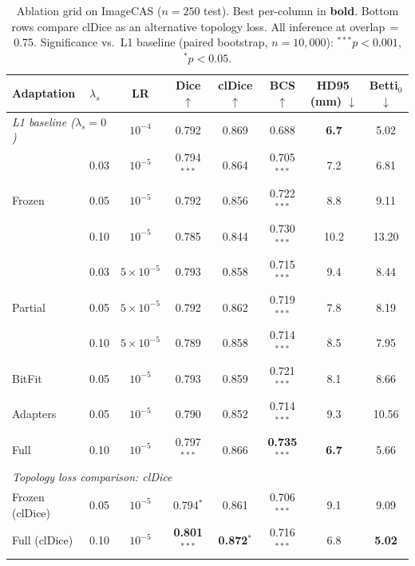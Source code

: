 \documentclass[runningheads]{llncs}
\begin{document}
\begin{table}[t]
\caption{Ablation grid on ImageCAS ($n{=}250$ test). Best per-column in \textbf{bold}. Bottom rows compare clDice as an alternative topology loss. All inference at overlap$\,{=}\,$0.75. Significance vs.\ L1 baseline (paired bootstrap, $n{=}10{,}000$): $^{***}p{<}0.001$, $^{*}p{<}0.05$.}
\label{tab:ablation}
\centering
\small
\begin{tabular}{llcccccc}
\toprule
Adaptation & $\lambda_s$ & LR & Dice $\uparrow$ & clDice $\uparrow$ & BCS $\uparrow$ & HD95\,(mm) $\downarrow$ & Betti$_0$ $\downarrow$ \\
\midrule
\multicolumn{2}{l}{\textit{L1 baseline ($\lambda_s{=}0$)}} & $10^{-4}$ & 0.792 & 0.869 & 0.688 & \textbf{6.7} & 5.02 \\
\midrule
\multirow{3}{*}{Frozen}
 & 0.03 & $10^{-5}$ & 0.794$^{***}$ & 0.864 & 0.705$^{***}$ & 7.2 & 6.81 \\
 & 0.05 & $10^{-5}$ & 0.792 & 0.856 & 0.722$^{***}$ & 8.8 & 9.11 \\
 & 0.10 & $10^{-5}$ & 0.785 & 0.844 & 0.730$^{***}$ & 10.2 & 13.20 \\
\midrule
\multirow{3}{*}{Partial}
 & 0.03 & $5{\times}10^{-5}$ & 0.793 & 0.858 & 0.715$^{***}$ & 9.4 & 8.44 \\
 & 0.05 & $5{\times}10^{-5}$ & 0.792 & 0.862 & 0.719$^{***}$ & 7.8 & 8.19 \\
 & 0.10 & $5{\times}10^{-5}$ & 0.789 & 0.858 & 0.714$^{***}$ & 8.5 & 7.95 \\
\midrule
BitFit & 0.05 & $10^{-5}$ & 0.793 & 0.859 & 0.721$^{***}$ & 8.1 & 8.66 \\
Adapters & 0.05 & $10^{-5}$ & 0.790 & 0.852 & 0.714$^{***}$ & 9.3 & 10.56 \\
\midrule
Full & 0.10 & $10^{-5}$ & 0.797$^{***}$ & 0.866 & \textbf{0.735}$^{***}$ & \textbf{6.7} & 5.66 \\
\midrule
\multicolumn{8}{l}{\textit{Topology loss comparison: clDice~\cite{shit_cldice_2021}}} \\
Frozen (clDice) & 0.05 & $10^{-5}$ & 0.794$^{*}$ & 0.861 & 0.706$^{***}$ & 9.1 & 9.09 \\
Full (clDice) & 0.10 & $10^{-5}$ & \textbf{0.801}$^{***}$ & \textbf{0.872}$^{*}$ & 0.716$^{***}$ & 6.8 & \textbf{5.02} \\
\bottomrule
\end{tabular}
\end{table}
\end{document}
